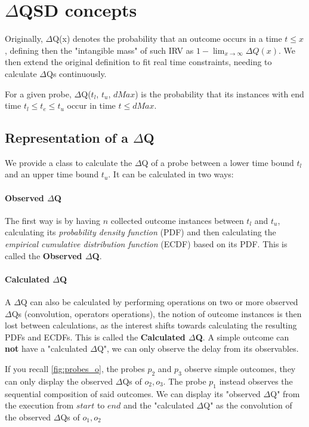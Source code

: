 \section{$\Delta$QSD concepts}

Originally, $\Delta$Q(x) denotes the probability that an outcome occurs in a time $t \le x$, defining then the "intangible mass" of such IRV as $1 - \lim_{x\to\infty} \Delta Q (x)$. \cite{myo}
We then extend the original definition to fit real time constraints, needing to calculate $\Delta$Qs continuously.

For a given probe, $\Delta$Q($t_l$, $t_u$, $dMax$) is the probability that its instances with end time $t_l \le t_e \le t_u$ occur in time $t \le dMax$.

\subsection{Representation of a $\Delta$Q}
    We provide a class to calculate the $\Delta$Q of a probe between a lower time bound $t_l$ and an upper time bound $t_u$. It can be calculated in two ways: 
    
    \paragraph{Observed $\Delta$Q}
    
    The first way is by having $n$ collected outcome instances between $t_l$ and $t_u$, calculating its \textit{probability density function} (PDF) and then calculating the \textit{empirical cumulative distribution function} (ECDF) based on its PDF. This is called the \textbf{Observed $\Delta$Q}.
    
    \paragraph{Calculated $\Delta$Q}
    
    A $\Delta$Q can also be calculated by performing operations on two or more observed $\Delta$Qs (convolution, operators operations), the notion of outcome instances is then lost between calculations, as the interest shifts towards calculating the resulting PDFs and ECDFs. This is called the \textbf{Calculated $\Delta$Q}. A simple outcome can \textbf{not} have a "calculated $\Delta$Q", we can only observe the delay from its observables.

    If you recall \cref{fig:probes_o}, the probes $p_2$ and $p_3$ observe simple outcomes, they can only display the observed $\Delta$Qs of $o_2, o_3$. The probe $p_1$ instead observes the sequential composition of said outcomes. We can display its "observed $\Delta$Q" from the execution from $start$ to $end$ and the "calculated $\Delta$Q" as the convolution of the observed $\Delta$Qs of $o_1, o_2$
    
